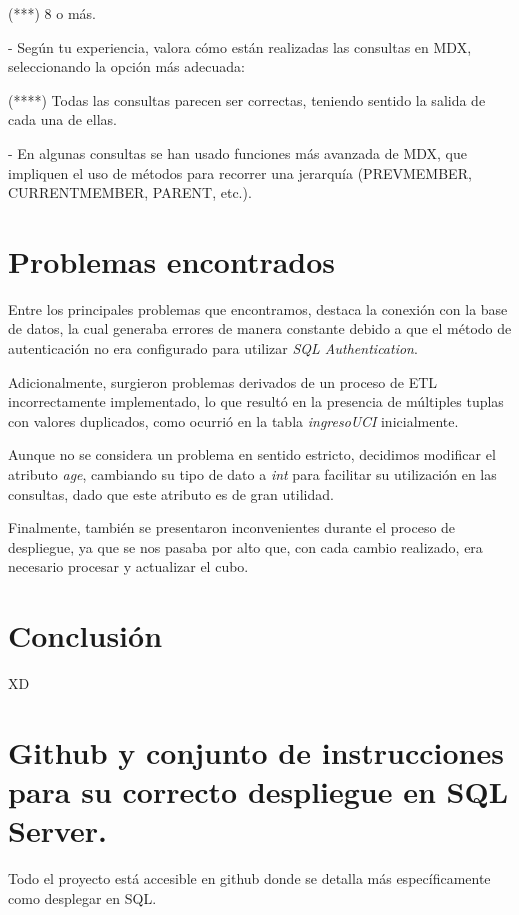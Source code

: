 \documentclass[12pt, a4paper, twoside]{article}
\begin{document}
	(***) 8 o más.
	
	
	- Según tu experiencia, valora cómo están realizadas las consultas en MDX, seleccionando la opción más adecuada:
	
	(****) Todas las consultas parecen ser correctas, teniendo sentido la salida de cada una de ellas. 
	
	
	- En algunas consultas se han usado funciones más avanzada de MDX, que impliquen el uso de métodos para recorrer una jerarquía (PREVMEMBER, CURRENTMEMBER, PARENT, etc.). 

	\section{Problemas encontrados}

	Entre los principales problemas que encontramos, destaca la conexión con la base de datos, la cual generaba errores de manera constante debido a que el método de autenticación no era configurado para utilizar \textit{SQL Authentication}.
	
	Adicionalmente, surgieron problemas derivados de un proceso de ETL incorrectamente implementado, lo que resultó en la presencia de múltiples tuplas con valores duplicados, como ocurrió en la tabla \textit{ingresoUCI} inicialmente.
	
	Aunque no se considera un problema en sentido estricto, decidimos modificar el atributo \textit{age}, cambiando su tipo de dato a \textit{int} para facilitar su utilización en las consultas, dado que este atributo es de gran utilidad.
	
	Finalmente, también se presentaron inconvenientes durante el proceso de despliegue, ya que se nos pasaba por alto que, con cada cambio realizado, era necesario procesar y actualizar el cubo.
	

	\section{Conclusión}
	
	XD


	\section{Github y conjunto de instrucciones para su correcto despliegue en SQL Server.}

	Todo el proyecto está accesible en github \cite{depab2024} donde se detalla más específicamente como desplegar en SQL.
	\printbibliography
	
	
	
	
\end{document}
